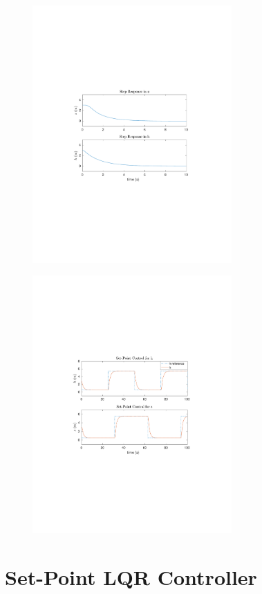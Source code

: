 \documentclass[dvips,12pt]{article}
\begin{document}
\begin{figure}
\centering
\begin{minipage}{.5\textwidth}
  \centering
  \includegraphics[trim = {4cm 8.75cm 4cm 9cm},clip,width=3in]{step_response.pdf}
  \label{fig:stepresp}
\end{minipage}%
\begin{minipage}{.5\textwidth}
  \centering
  \includegraphics[trim = {4cm 8.5cm 4cm 8.5cm},clip,width=3in]{set_point.pdf}
  \label{fig:setpoint}
\end{minipage}
\end{figure}

\section{Set-Point LQR Controller}
\end{document}
